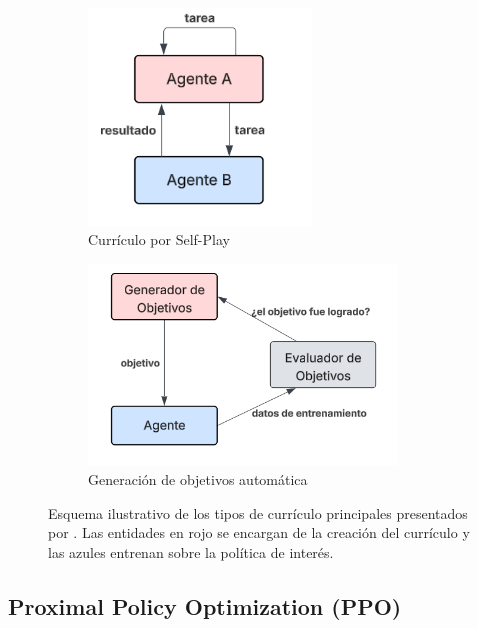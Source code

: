 \begin{figure}[h!]
	\begin{subfigure}[b]{0.35\textwidth}
		\centering
		\includegraphics[width=0.65\textwidth]{images/marco-teorico/curr-3}
		\caption{Currículo por Self-Play}
		\label{fig:curr-3}
	\end{subfigure}
	\hspace{0.05\textwidth}
	\begin{subfigure}[b]{0.35\textwidth}
		\centering
		\includegraphics[width=0.9\textwidth]{images/marco-teorico/curr-4}
		\caption{Generación de objetivos automática}
		\label{fig:curr-4}
	\end{subfigure}
	
	\caption{Esquema ilustrativo de los tipos de currículo principales presentados por \textcite{weng2020curriculum}. Las entidades en rojo se encargan de la creación del currículo y las azules entrenan sobre la política de interés.}
	\label{fig:curriculum-types}
\end{figure}


\subsection{Proximal Policy Optimization (PPO)}

